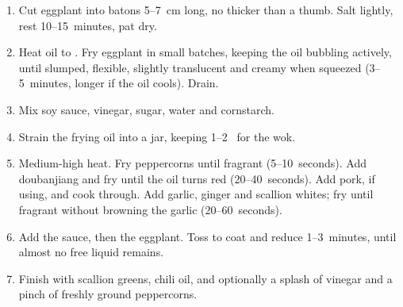 \label{yuxiang-qiezi}

\begin{ingredients}
\end{ingredients}


\begin{recipe}
  \begin{enumerate}

  \item Cut eggplant into batons 5--7~cm long, no thicker than a
    thumb.  Salt lightly, rest 10--15~minutes, pat dry.

  \item Heat oil to .  Fry eggplant in small
    batches, keeping the oil bubbling actively, until slumped,
    flexible, slightly translucent and creamy when squeezed
    (3--5~minutes, longer if the oil cools).  Drain.

  \item Mix soy sauce, vinegar, sugar, water and cornstarch.

  \item Strain the frying oil into a jar, keeping 1--2~\tbsp{} for the
    wok.

  \item Medium-high heat.  Fry peppercorns until fragrant
    (5--10~seconds).  Add doubanjiang and fry until the oil turns red
    (20--40~seconds).  Add pork, if using, and cook through.  Add
    garlic, ginger and scallion whites; fry until fragrant without
    browning the garlic (20--60~seconds).

  \item Add the sauce, then the eggplant.  Toss to coat and reduce
    1--3~minutes, until almost no free liquid remains.

  \item Finish with scallion greens, chili oil, and optionally a
    splash of vinegar and a pinch of freshly ground peppercorns.

  \end{enumerate}
\end{recipe}

